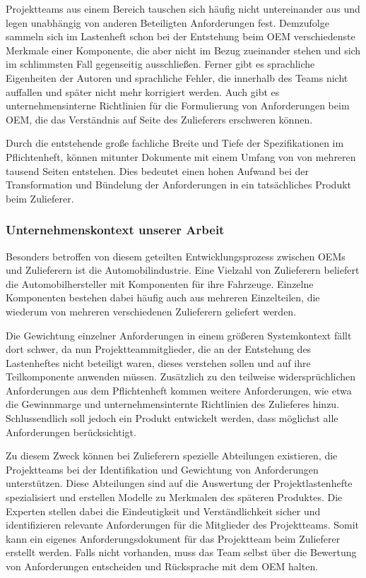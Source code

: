 \documentclass[12pt]{report}
\begin{document}
Projektteams aus einem Bereich tauschen sich häufig nicht untereinander aus und legen unabhängig von anderen Beteiligten Anforderungen fest. Demzufolge sammeln sich im Lastenheft schon bei der Entstehung beim OEM verschiedenste Merkmale einer Komponente, die aber nicht im Bezug zueinander stehen und sich im schlimmsten Fall gegenseitig ausschließen. Ferner gibt es sprachliche Eigenheiten der Autoren und sprachliche Fehler, die innerhalb des Teams nicht auffallen und später nicht mehr korrigiert werden. Auch gibt es unternehmensinterne Richtlinien für die Formulierung von Anforderungen beim OEM, die das Verständnis auf Seite des Zulieferers erschweren können. 

Durch die entstehende große fachliche Breite und Tiefe der Spezifikationen im Pflichtenheft, können mitunter Dokumente mit einem Umfang von von mehreren tausend Seiten entstehen. Dies bedeutet einen hohen Aufwand bei der Transformation und Bündelung der Anforderungen in ein tatsächliches Produkt beim Zulieferer. 

\subsubsection{Unternehmenskontext unserer Arbeit}
Besonders betroffen von diesem geteilten Entwicklungsprozess zwischen OEMs und Zulieferern ist die Automobilindustrie. Eine Vielzahl von Zulieferern beliefert die Automobilhersteller mit Komponenten für ihre Fahrzeuge. Einzelne Komponenten bestehen dabei häufig auch aus mehreren Einzelteilen, die wiederum von mehreren verschiedenen Zulieferern geliefert werden.

Die Gewichtung einzelner Anforderungen in einem größeren Systemkontext fällt dort schwer, da nun Projektteammitglieder, die an der Entstehung des Lastenheftes nicht beteiligt waren, dieses verstehen sollen und auf ihre Teilkomponente anwenden müssen. Zusätzlich zu den teilweise widersprüchlichen Anforderungen aus dem Pflichtenheft kommen weitere Anforderungen, wie etwa die Gewinnmarge und unternehmensinternte Richtlinien des Zulieferes hinzu. Schlussendlich soll jedoch ein Produkt entwickelt werden, dass möglichst alle Anforderungen berücksichtigt. 

Zu diesem Zweck können bei Zulieferern spezielle Abteilungen existieren, die Projektteams bei der Identifikation und Gewichtung von Anforderungen unterstützen. Diese Abteilungen sind auf die Auswertung der Projektlastenhefte spezialisiert und erstellen Modelle zu Merkmalen des späteren Produktes. Die Experten stellen dabei die Eindeutigkeit und Verständlichkeit sicher und identifizieren relevante Anforderungen für die Mitglieder des Projektteams. Somit kann ein eigenes Anforderungsdokument für das Projektteam beim Zulieferer erstellt werden. Falls nicht vorhanden, muss das Team selbst über die Bewertung von Anforderungen entscheiden und Rücksprache mit dem OEM halten.
\end{document}
